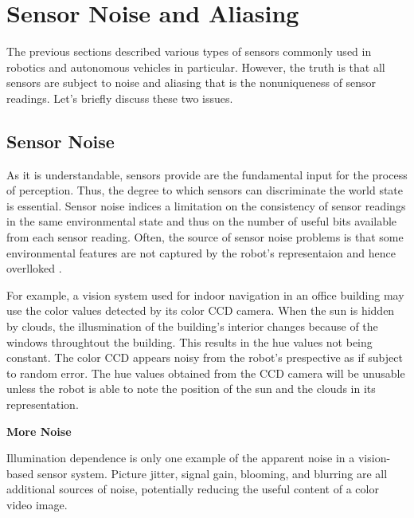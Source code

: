 \section{Sensor Noise and Aliasing}
\label{sensor_noise_aliasing}

The previous sections described various  types of sensors commonly used in robotics and autonomous vehicles in particular. However, the truth is that all sensors
are subject to noise and aliasing that is  the nonuniqueness of sensor readings. Let's briefly discuss these two
issues.

\subsection{Sensor Noise}
\label{sensor_noise}
As it is understandable, sensors provide are the fundamental input for the process of perception. Thus, the degree to which sensors can discriminate
the world state is essential. Sensor noise indices a limitation on the consistency of sensor readings in the same environmental
state and thus on the number of useful bits available from each sensor reading. Often, the source of sensor noise problems is that
some environmental features are not captured by the robot's representaion and hence overlloked \cite{Siegwart2011}.

\begin{framed}
\begin{exmp}

For example, a vision system used for indoor navigation in an office building may use
the color values detected by its color CCD camera. When the sun is hidden by clouds, the 
illusmination of the building's interior changes because of the windows throughtout the building. This results
in the hue values not being constant. The color CCD appears noisy from the robot's prespective as if subject
to random error. The hue values obtained from the CCD camera will be unusable unless the robot is able
to note the position of the sun and the clouds in its representation.
\end{exmp}
\end{framed}


\begin{framed}
\begin{remark}{\textbf{More Noise}}


Illumination dependence is only one example of the apparent noise in a vision-based
sensor system. Picture jitter, signal gain, blooming, and blurring are all additional sources
of noise, potentially reducing the useful content of a color video image.

\end{remark}
\end{framed}

